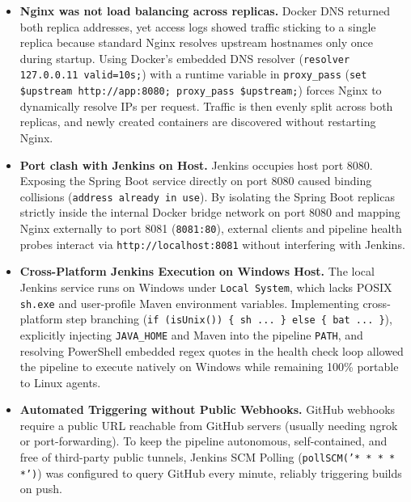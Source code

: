 \documentclass[11pt,a4paper]{article}
\begin{document}
\begin{itemize}[leftmargin=*,itemsep=3pt]
    \item \textbf{Nginx was not load balancing across replicas.} Docker DNS returned both replica addresses, yet access logs showed traffic sticking to a single replica because standard Nginx resolves upstream hostnames only once during startup. Using Docker's embedded DNS resolver (\texttt{resolver 127.0.0.11 valid=10s;}) with a runtime variable in \texttt{proxy\_pass} (\texttt{set \$upstream http://app:8080; proxy\_pass \$upstream;}) forces Nginx to dynamically resolve IPs per request. Traffic is then evenly split across both replicas, and newly created containers are discovered without restarting Nginx.
    
    \item \textbf{Port clash with Jenkins on Host.} Jenkins occupies host port 8080. Exposing the Spring Boot service directly on port 8080 caused binding collisions (\texttt{address already in use}). By isolating the Spring Boot replicas strictly inside the internal Docker bridge network on port 8080 and mapping Nginx externally to port 8081 (\texttt{8081:80}), external clients and pipeline health probes interact via \texttt{http://localhost:8081} without interfering with Jenkins.
    
    \item \textbf{Cross-Platform Jenkins Execution on Windows Host.} The local Jenkins service runs on Windows under \texttt{Local System}, which lacks POSIX \texttt{sh.exe} and user-profile Maven environment variables. Implementing cross-platform step branching (\texttt{if (isUnix()) \{ sh ... \} else \{ bat ... \}}), explicitly injecting \texttt{JAVA\_HOME} and Maven into the pipeline \texttt{PATH}, and resolving PowerShell embedded regex quotes in the health check loop allowed the pipeline to execute natively on Windows while remaining 100\% portable to Linux agents.
    
    \item \textbf{Automated Triggering without Public Webhooks.} GitHub webhooks require a public URL reachable from GitHub servers (usually needing ngrok or port-forwarding). To keep the pipeline autonomous, self-contained, and free of third-party public tunnels, Jenkins SCM Polling (\texttt{pollSCM('* * * * *')}) was configured to query GitHub every minute, reliably triggering builds on push.
\end{itemize}

\end{document}
